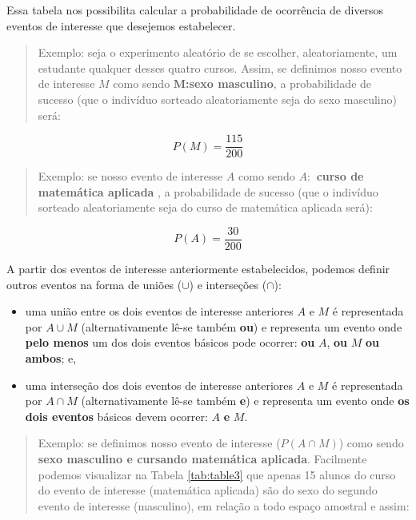 \documentclass[
]{book}
\providecommand{\tightlist}{%
  \setlength{\itemsep}{0pt}\setlength{\parskip}{0pt}}
\begin{document}
\hfill\break

Essa tabela nos possibilita calcular a probabilidade de ocorrência de diversos eventos de interesse que desejemos estabelecer.

\begin{quote}
Exemplo: seja o experimento aleatório de se escolher, aleatoriamente, um estudante qualquer desses quatro cursos. Assim, se definimos nosso evento de interesse \(M\) como sendo \textbf{M:sexo masculino}, a probabilidade de sucesso (que o indivíduo sorteado aleatoriamente seja do sexo masculino) será:
\end{quote}

\[
P(M) = \frac{115}{200}
\]

\begin{quote}
Exemplo: se nosso evento de interesse \(A\) como sendo \textbf{\(A:\) curso de matemática aplicada} , a probabilidade de sucesso (que o indivíduo sorteado aleatoriamente seja do curso de matemática aplicada será):
\end{quote}

\[
P(A) = \frac{30}{200}
\]

A partir dos eventos de interesse anteriormente estabelecidos, podemos definir outros eventos na forma de uniões (\(\cup\)) e interseções (\(\cap\)):

\begin{itemize}
\tightlist
\item
  uma união entre os dois eventos de interesse anteriores \(A\) e \(M\) é representada por \(A \cup M\) (alternativamente lê-se também \textbf{ou}) e representa um evento onde \textbf{pelo menos} um dos dois eventos básicos pode ocorrer: \textbf{ou} \(A\), \textbf{ou} \(M\) \textbf{ou ambos}; e,\\
\item
  uma interseção dos dois eventos de interesse anteriores \(A\) e \(M\) é representada por \(A \cap M\) (alternativamente lê-se também \textbf{e}) e representa um evento onde \textbf{os dois eventos} básicos devem ocorrer: \(A\) \textbf{e} \(M\).
\end{itemize}

\begin{quote}
Exemplo: se definimos nosso evento de interesse (\(P(A \cap M)\)) como sendo \textbf{sexo masculino e cursando matemática aplicada}. Facilmente podemos visualizar na Tabela \ref{tab:table3} que apenas 15 alunos do curso do evento de interesse (matemática aplicada) são do sexo do segundo evento de interesse (masculino), em relação a todo espaço amostral e assim:
\end{quote}
\end{document}
